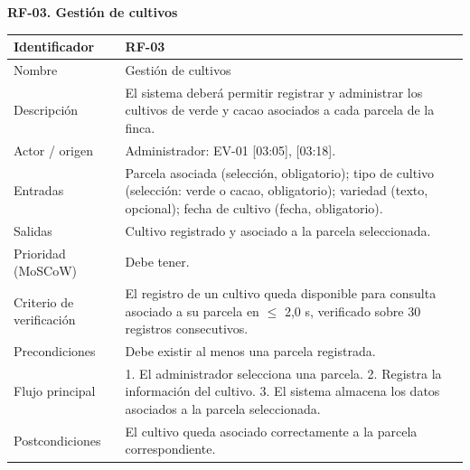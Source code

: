 \documentclass[12pt,a4paper]{article}
\begin{document}
\begin{minipage}{\linewidth}
\bigskip
\noindent\textbf{RF-03. Gestión de cultivos}
\label{tab:RF-03}

\begin{center}
\begin{tabular}{|p{3.5cm}|p{10.7cm}|}
\hline
Identificador & RF-03 \\
\hline
Nombre & Gestión de cultivos \\
\hline
Descripción & El sistema deberá permitir registrar y administrar los cultivos de verde y cacao asociados a cada parcela de la finca. \\
\hline
Actor / origen & Administrador: EV-01 [03:05], [03:18]. \\
\hline
Entradas & Parcela asociada (selección, obligatorio); tipo de cultivo (selección: verde o cacao, obligatorio); variedad (texto, opcional); fecha de cultivo (fecha, obligatorio). \\
\hline
Salidas & Cultivo registrado y asociado a la parcela seleccionada. \\
\hline
Prioridad (MoSCoW) & Debe tener. \\
\hline
Criterio de verificación & El registro de un cultivo queda disponible para consulta asociado a su parcela en $\leq$ 2,0 s, verificado sobre 30 registros consecutivos. \\
\hline
Precondiciones & Debe existir al menos una parcela registrada. \\
\hline
Flujo principal & 1. El administrador selecciona una parcela. 2. Registra la información del cultivo. 3. El sistema almacena los datos asociados a la parcela seleccionada. \\
\hline
Postcondiciones & El cultivo queda asociado correctamente a la parcela correspondiente. \\
\hline
\end{tabular}
\end{center}
\end{minipage}
\end{document}
